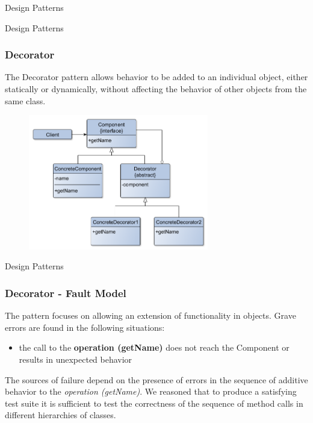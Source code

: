 \documentclass{beamer}
\begin{document}
\begin{section}{Design Patterns}
\begin{subsection}{Design Patterns}
	\begin{frame}
		\frametitle{Decorator}
		The Decorator pattern allows behavior to be added to an individual object, either statically or dynamically, without affecting the behavior of other objects from the same class.

\begin{figure}[!h]
	\centering
	\includegraphics[width=0.7\textwidth]{./Decorator/ClassDiagram.png}	
	\label{DeclassDiag}
\end{figure} 
		
	\end{frame}
\end{subsection}

\begin{subsection}{Design Patterns}
	\begin{frame}
		\frametitle{Decorator - Fault Model}
		
		The pattern focuses on allowing an extension of functionality in objects. Grave errors are found in the following situations:  
		\begin{itemize}
			\item the call to the \textbf{operation (getName)} does not reach the Component or results in unexpected behavior
		\end{itemize}
		\vspace{5mm}
	The sources of failure depend on the presence of errors in the sequence of additive behavior to the \textit{operation (getName)}. We reasoned that to produce a satisfying test suite it is sufficient to test the correctness of the sequence of method calls in different hierarchies of classes.
		
	\end{frame}
\end{subsection}


\end{section}
\end{document}
